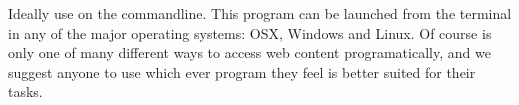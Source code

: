 Ideally use   on the commandline. This
program can be launched from the terminal in any of the major operating
systems: OSX, Windows and Linux. Of course  is only one of
many different ways to access web content programatically, and we
suggest anyone to use which ever program they feel is better suited for
their tasks.

